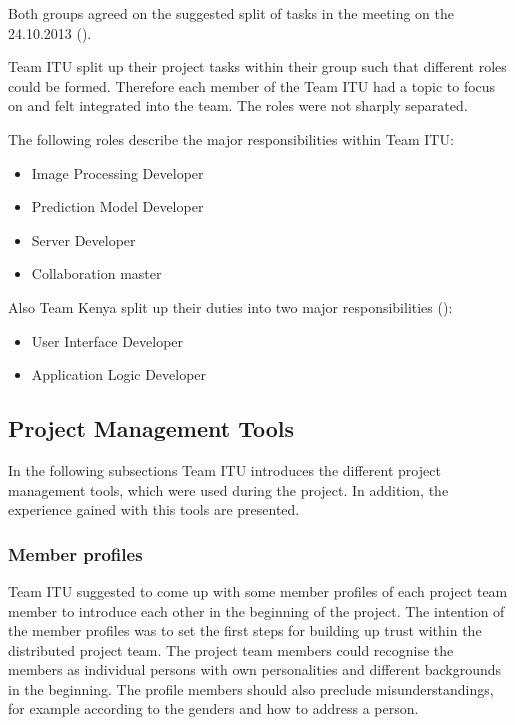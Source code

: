 Both groups agreed on the suggested split of tasks in the meeting on the 24.10.2013 ().

Team ITU split up their project tasks within their group such that different roles could be formed. Therefore each member of the Team ITU had a topic to focus on and felt integrated into the team. The roles were not sharply separated.

The following roles describe the major responsibilities within Team ITU:
	\begin{itemize}
		\item Image Processing Developer
		\item Prediction Model Developer
		\item Server Developer
		\item Collaboration master
	\end{itemize}

Also Team Kenya split up their duties into two major responsibilities ():
	\begin{itemize}
		\item User Interface Developer
		\item Application Logic Developer
	\end{itemize}


\subsection{Project Management Tools}
In the following subsections Team ITU introduces the different project management tools, which were used during the project. In addition, the experience gained with this tools are presented.

\subsubsection {Member profiles}
Team ITU suggested to come up with some member profiles of each project team member to introduce each other in the beginning of the project. The intention of the member profiles was to set the first steps for building up trust within the distributed project team. The project team members could recognise the members as individual persons with own personalities and different backgrounds in the beginning. The profile members should also preclude misunderstandings, for example according to the genders and how to address a person.

